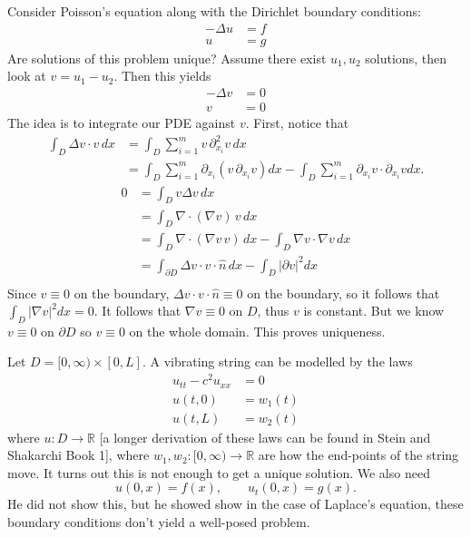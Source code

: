 \begin{example}
	Consider Poisson's equation along with the Dirichlet boundary conditions:
	\begin{align*}
		\tag{\( x \in D \)} - \Delta u &= f \\
		\tag{\( x \in \partial D \)}u &= g
	\end{align*}
	Are solutions of this problem unique? Assume there exist \( u_{1}, u_{2} \) solutions, then look at \( v = u_{1} - u_{2} \).
	Then this yields
	\begin{align*}
		\tag{\( x \in D \)}- \Delta v &= 0 \\
		\tag{\( x \in \partial D \)}v &= 0
	\end{align*}
	The idea is to integrate our PDE against \( v \). First, notice that
	\begin{align*}
		\int_{D}  \Delta v \cdot v \, dx &= \int_{D}  \sum_{i=1}^{m} v \, \partial_{x_{i}}^{2} v \, dx \\
																	&= \int_{D}  \sum_{i=1}^{m} \partial_{x_{i}} \left( v\, \partial_{x_{i}} v \right) dx - \int_{D} \sum_{i=1}^{m} \partial_{x_{i}} v \cdot \partial_{x_{i}} v dx.
	\end{align*}
	\begin{align*}
		0 &= \int_{D} v \Delta v \, dx \\
			&= \int_{D} \nabla \cdot (\nabla v) \,  v\, dx \\
		\tag{1}&= \int_{D} \nabla \cdot (\nabla v \, v) \, dx - \int_{D}  \nabla v \cdot \nabla v \, dx \\
			&= \int_{\partial D}  \Delta v \cdot v \cdot \hat n \, dx - \int_{D} |\partial v|^{2} dx \\
	\end{align*}
	Since \( v \equiv 0 \) on the boundary, \( \Delta v \cdot v \cdot \hat n \equiv 0 \) on the boundary, so it follows that \( \int_{D} | \nabla v|^{2} dx = 0 \). It follows that \( \nabla v \equiv 0 \) on \( D \), thus \( v \) is constant. But we know \( v \equiv 0 \) on \( \partial D \) so \( v \equiv 0 \) on the whole domain. This proves uniqueness.
\end{example}

\begin{example}
	Let \( D = [0, \infty) \times [0, L] \). A vibrating string can be modelled by the laws
	\begin{align*}
		u_{tt} - c^{2} u_{x x} &= 0 \\
		u(t, 0) &= w_{1}(t) \\
		u(t, L) &= w_{2}(t)
	\end{align*}
	where \( u : D \to \mathbb{R} \) [a longer derivation of these laws can be found in Stein and Shakarchi Book 1], where \( w_{1}, w_{2} : [0, \infty) \to \mathbb{R} \) are how the end-points of the string move. It turns out this is not enough to get a unique solution. We also need
	\[ u(0, x) = f(x), \qquad u_{t}(0, x) = g(x). \]
	He did not show this, but he showed show in the case of Laplace's equation, these boundary conditions don't yield a well-posed problem.
\end{example}

